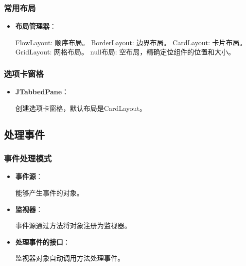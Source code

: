\documentclass[a4paper, 10pt]{ctexart}
\begin{document}
\subsubsection{常用布局}
\begin{itemize}
  \item \textbf{布局管理器}：
  \begin{codeblock}
FlowLayout: 顺序布局。
BorderLayout: 边界布局。
CardLayout: 卡片布局。
GridLayout: 网格布局。
null布局: 空布局，精确定位组件的位置和大小。
  \end{codeblock}
\end{itemize}

\subsubsection{选项卡窗格}
\begin{itemize}
  \item \textbf{JTabbedPane}：
  \begin{codeblock}
创建选项卡窗格，默认布局是CardLayout。
  \end{codeblock}
\end{itemize}

\subsection{处理事件}
\subsubsection{事件处理模式}
\begin{itemize}
  \item \textbf{事件源}：
  \begin{codeblock}
能够产生事件的对象。
  \end{codeblock}
  \item \textbf{监视器}：
  \begin{codeblock}
事件源通过方法将对象注册为监视器。
  \end{codeblock}
  \item \textbf{处理事件的接口}：
  \begin{codeblock}
监视器对象自动调用方法处理事件。
  \end{codeblock}
\end{itemize}
\end{document}
